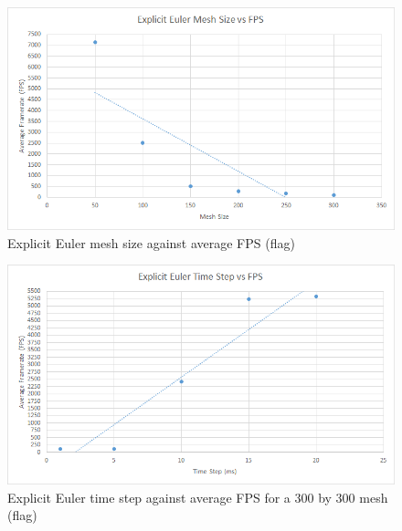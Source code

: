     \begin{figure}
    \begin{center}
      \includegraphics[scale=.9]{Figures/flag_ee_m_fps}
    \end{center}
    \caption{Explicit Euler mesh size against average FPS (flag)}
    \label{fig:ee mesh fps flag}
  \end{figure}
  
    \begin{figure}
    \begin{center}
      \includegraphics[scale=.9]{Figures/flag_ee_ts_fps}
    \end{center}
    \caption{Explicit Euler time step against average FPS for a 300 by 300 mesh (flag)}
    \label{fig:ee step fps flag}
  \end{figure}
  
